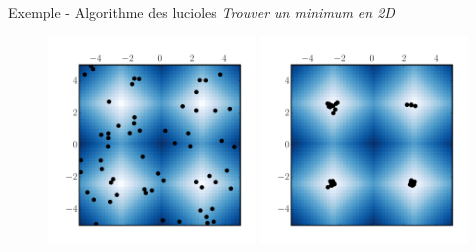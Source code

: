 \documentclass{beamer}
\begin{document}





\begin{frame}{Exemple - Algorithme des lucioles}
  \textit{Trouver un minimum en 2D}
   \begin{figure}[tb]
    \centering
    \includegraphics[width=0.49\textwidth]{figures/fireflyout1.pdf}
    \includegraphics[width=0.49\textwidth]{figures/fireflyout2.pdf}
  \end{figure}
\end{frame}
\end{document}
